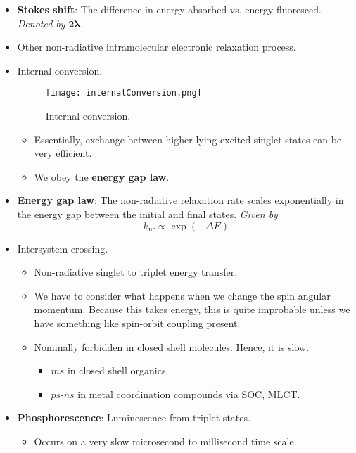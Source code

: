 \documentclass[../notes.tex]{subfiles}
\begin{document}
\begin{itemize}
\begin{itemize}
    \end{itemize}
    \item \textbf{Stokes shift}: The difference in energy absorbed vs. energy fluoresced. \emph{Denoted by} $\bm{2\lambda}$.
    \item Other non-radiative intramolecular electronic relaxation process.
    \item Internal conversion.
    \begin{figure}[h!]
        \centering
        \texttt{[image: internalConversion.png]}
        \caption{Internal conversion.}
        \label{fig:internalConversion}
    \end{figure}
    \begin{itemize}
        \item Essentially, exchange between higher lying excited singlet states can be very efficient.
        \item We obey the \textbf{energy gap law}.
    \end{itemize}
    \item \textbf{Energy gap law}: The non-radiative relaxation rate scales exponentially in the energy gap between the initial and final states. \emph{Given by}
    \begin{equation*}
        k_\text{nr} \propto \exp(-\Delta E)
    \end{equation*}
    \item Intersystem crossing.
    \begin{itemize}
        \item Non-radiative singlet to triplet energy transfer.
        \item We have to consider what happens when we change the spin angular momentum. Because this takes energy, this is quite improbable unless we have something like spin-orbit coupling present.
        \item Nominally forbidden in closed shell molecules. Hence, it is slow.
        \begin{itemize}
            \item $ms$ in closed shell organics.
            \item $ps$-$ns$ in metal coordination compounds via SOC, MLCT.
        \end{itemize}
    \end{itemize}
    \item \textbf{Phosphorescence}: Luminescence from triplet states.
    \begin{itemize}
        \item Occurs on a very slow microsecond to millisecond time scale.

\end{itemize}
\end{itemize}
\end{document}
